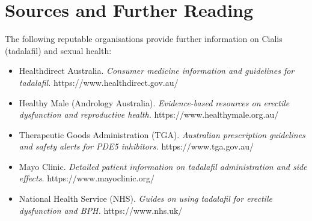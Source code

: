 \section*{Sources and Further Reading}
The following reputable organisations provide further information on Cialis (tadalafil) and sexual health:
\begin{itemize}
    \item Healthdirect Australia. \textit{Consumer medicine information and guidelines for tadalafil.} https://www.healthdirect.gov.au/
    \item Healthy Male (Andrology Australia). \textit{Evidence-based resources on erectile dysfunction and reproductive health.} https://www.healthymale.org.au/
    \item Therapeutic Goods Administration (TGA). \textit{Australian prescription guidelines and safety alerts for PDE5 inhibitors.} https://www.tga.gov.au/
    \item Mayo Clinic. \textit{Detailed patient information on tadalafil administration and side effects.} https://www.mayoclinic.org/
    \item National Health Service (NHS). \textit{Guides on using tadalafil for erectile dysfunction and BPH.} https://www.nhs.uk/
\end{itemize}
